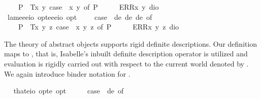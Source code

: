 \begin{isabellebody}
\ \ \ \ P{\isacharparenleft}{\isacharunderscore}{\isacharparenright}\ {\isasymRightarrow}\ T{\isacharparenleft}{\isasymlambda}x\ y{\isachardot}\ case\ {\isacharparenleft}{\isasymPhi}\ x\ y{\isacharparenright}\ of\ P{\isacharparenleft}{\isasymphi}{\isacharparenright}\ {\isasymRightarrow}\ {\isasymphi}{\isacharparenright}\ {\isacharbar}\ {\isacharunderscore}\ {\isasymRightarrow}\ ERR{\isacharparenleft}{\isasymlambda}x\ y{\isachardot}\ dio{\isacharparenright}{\isachardoublequoteclose}\isanewline
\ \isamarkupfalse%
\ lam{}{\isacharcolon}{\isacharcolon}{\isachardoublequoteopen}{\isacharparenleft}e{\isasymRightarrow}e{\isasymRightarrow}e{\isasymRightarrow}io\ opt{\isacharparenright}{\isasymRightarrow}{\isacharparenleft}e{\isasymRightarrow}e{\isasymRightarrow}e{\isasymRightarrow}io{\isacharparenright}\ opt{\isachardoublequoteclose}\ {\isacharparenleft}{\isachardoublequoteopen}\isactrlbold {\isasymlambda}\ \ {\isachardoublequoteopen}\isactrlbold {\isasymlambda}\ {\isasymequiv}\ case\ {\isacharparenleft}{\isasymPhi}\ de\ de\ de{\isacharparenright}\ of\isanewline
\ \ \ \ P{\isacharparenleft}{\isacharunderscore}{\isacharparenright}\ {\isasymRightarrow}\ T{\isacharparenleft}{\isasymlambda}x\ y\ z{\isachardot}\ case\ {\isacharparenleft}{\isasymPhi}\ x\ y\ z{\isacharparenright}\ of\ P{\isacharparenleft}{\isasymphi}{\isacharparenright}\ {\isasymRightarrow}\ {\isasymphi}{\isacharparenright}\ {\isacharbar}\ {\isacharunderscore}\ {\isasymRightarrow}\ ERR{\isacharparenleft}{\isasymlambda}x\ y\ z{\isachardot}\ dio{\isacharparenright}{\isachardoublequoteclose}%
\begin{isamarkuptext}%
The theory of abstract objects supports rigid definite descriptions. Our definition maps
   to , that is, Isabelle's inbuilt definite description operator 
  is utilized and evaluation is rigidly carried out with respect to the current world denoted by .
  We again introduce binder notation for \isa{\isactrlbold {\isasymiota}}.%
\end{isamarkuptext}%
\isamarkuptrue%
\ \isamarkupfalse%
\ that{\isacharcolon}{\isacharcolon}{\isachardoublequoteopen}{\isacharparenleft}e{\isasymRightarrow}io\ opt{\isacharparenright}{\isasymRightarrow}e\ opt{\isachardoublequoteclose}\ {\isacharparenleft}{\isachardoublequoteopen}\isactrlbold {\isasymiota}{\isachardoublequoteclose}{\isacharparenright}\ \ \ {\isachardoublequoteopen}\isactrlbold {\isasymiota}{\isasymPhi}\ {\isasymequiv}\ case\ {\isacharparenleft}{\isasymPhi}\ de{\isacharparenright}\ of\isanewline

\end{isabellebody}
